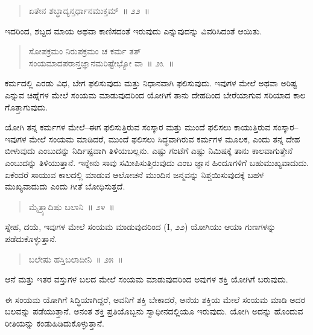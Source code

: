 \begin{verse}
ಏತೇನ ಶಬ್ಧಾದ್ಯನ್ತರ್ಧಾನಮುಕ್ತಮ್​~॥ ೨೨~॥
\end{verse}

\vspace{-0.3cm}

ಇದರಿಂದ, ಶಬ್ದದ ಮಾಯ ಅಥವಾ ಕಾಣಿಸದಂತೆ ಇರುವುದು ಎನ್ನುವುದನ್ನು ವಿವರಿಸಿದಂತೆ ಆಯಿತು. 

\vspace{-0.3cm}

\begin{verse}
ಸೋಪಕ್ರಮಂ ನಿರುಪಕ್ರಮಂ ಚ ಕರ್ಮ ತತ್​\\ಸಂಯಮಾದಪರಾನ್ತಜ್ಞಾನಮರಿಷ್ಟೇಭ್ಯೋ ವಾ~॥ ೨೩~॥
\end{verse}

\vspace{-0.3cm}

ಕರ್ಮದಲ್ಲಿ ಎರಡು ವಿಧ, ಬೇಗ ಫಲಿಸುವುದು ಮತ್ತು ನಿಧಾನವಾಗಿ ಫಲಿಸುವುದು. ಇವುಗಳ ಮೇಲೆ ಅಥವಾ ಅರಿಷ್ಟ ಎನ್ನುವ ಚಿಹ್ನೆಗಳ ಮೇಲೆ ಸಂಯಮ ಮಾಡುವುದರಿಂದ ಯೋಗಿಗೆ ತಾನು ದೇಹದಿಂದ ಬೇರೆಯಾಗುವ ಸರಿಯಾದ ಕಾಲ ಗೊತ್ತಾಗುವುದು. 

ಯೋಗಿ ತನ್ನ ಕರ್ಮಗಳ ಮೇಲೆ–ಈಗ ಫಲಿಸುತ್ತಿರುವ ಸಂಸ್ಕಾರ ಮತ್ತು ಮುಂದೆ ಫಲಿಸಲು ಕಾಯುತ್ತಿರುವ ಸಂಸ್ಕಾರ–ಇವುಗಳ ಮೇಲೆ ಸಂಯಮ ಮಾಡಿದರೆ, ಮುಂದೆ ಫಲಿಸಲು ಸಿದ್ಧವಾಗಿರುವ ಕರ್ಮಗಳ ಮೂಲಕ, ಎಂದು ತನ್ನ ದೇಹ ಬೀಳುವುದು ಎಂಬುದನ್ನು ನಿರ್ದಿಷ್ಟವಾಗಿ ತಿಳಿಯಬಲ್ಲನು. ಎಷ್ಟು ಗಂಟೆಗೆ ಎಷ್ಟು ನಿಮಿಷಕ್ಕೆ ತಾನು ಕಾಲವಾಗುತ್ತೇನೆ ಎಂಬುದನ್ನು ತಿಳಿಯುತ್ತಾನೆ. ಇನ್ನೇನು ಸಾವು ಸಮೀಪಿಸುತ್ತಿರುವುದು ಎಂಬ ಜ್ಞಾನ ಹಿಂದೂಗಳಿಗೆ ಬಹುಮುಖ್ಯವಾದುದು. ಏಕೆಂದರೆ ಸಾಯುವ ಕಾಲದಲ್ಲಿ ಮಾಡುವ ಆಲೋಚನೆ ಮುಂದಿನ ಜನ್ಮವನ್ನು ನಿಶ್ಚಯಿಸುವುದಕ್ಕೆ ಬಹಳ ಮುಖ್ಯವಾದುದು ಎಂದು ಗೀತೆ ಬೋಧಿಸುತ್ತದೆ. 

\vspace{-0.3cm}

\begin{verse}
ಮೈತ್ರ್ಯಾದಿಷು ಬಲಾನಿ~॥ ೨೪~॥
\end{verse}

\vspace{-0.3cm}

ಸ್ನೇಹ, ದಯೆ, ಇವುಗಳ ಮೇಲೆ ಸಂಯಮ ಮಾಡುವುದರಿಂದ (I, ೨೨) ಯೋಗಿಯು ಆಯಾ ಗುಣಗಳನ್ನು ಪಡೆದುಕೊಳ್ಳುತ್ತಾನೆ. 

\vspace{-0.3cm}

\begin{verse}
ಬಲೇಷು ಹಸ್ತಿಬಲಾದೀನಿ~॥ ೨೫~॥
\end{verse}

\vspace{-0.3cm}

ಆನೆ ಮತ್ತು ಇತರ ವಸ್ತುಗಳ ಬಲದ ಮೇಲೆ ಸಂಯಮ ಮಾಡುವುದರಿಂದ ಅವುಗಳ ಶಕ್ತಿ ಯೋಗಿಗೆ ಬರುವುದು. 

ಈ ಸಂಯಮ ಯೋಗಿಗೆ ಸಿದ್ಧಿಯಾಗಿದ್ದರೆ, ಅವನಿಗೆ ಶಕ್ತಿ ಬೇಕಾದರೆ, ಆನೆಯ ಶಕ್ತಿಯ ಮೇಲೆ ಸಂಯಮ ಮಾಡಿ ಅದರ ಬಲವನ್ನು ಪಡೆಯುತ್ತಾನೆ. ಅನಂತ ಶಕ್ತಿ ಪ್ರತಿಯೊಬ್ಬನು ಸ್ವಾಧೀನದಲ್ಲಿಯೂ ಇರುವುದು. ಯೋಗಿ ಅದನ್ನು ಹೊಂದುವ ರೀತಿಯನ್ನು ಕಂಡುಹಿಡಿದುಕೊಳ್ಳುತ್ತಾನೆ. 

